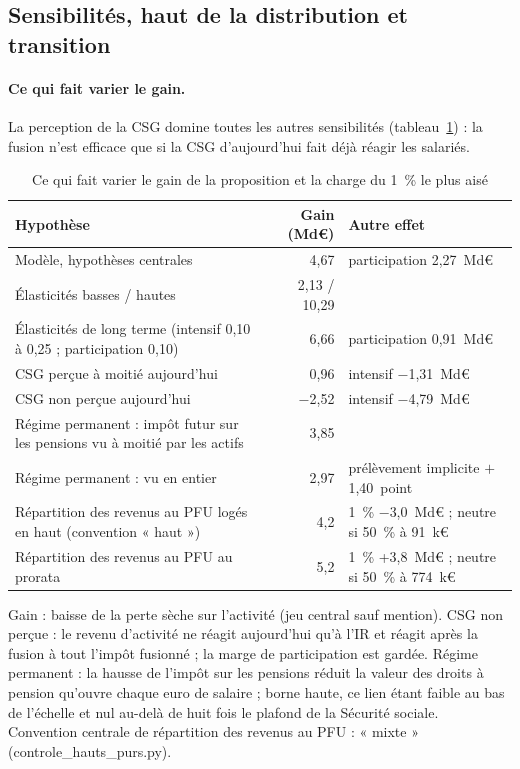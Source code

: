 \documentclass[11pt,a4paper]{article}
\begin{document}
\subsection{Sensibilités, haut de la distribution et transition}

\paragraph{Ce qui fait varier le gain.} La perception de la CSG domine toutes les autres sensibilités
(tableau~\ref{tab:ircsg_sens}) : la fusion n'est efficace que si la CSG d'aujourd'hui fait déjà réagir les salariés.

\begin{table}[!htbp]\centering\scriptsize\setlength{\tabcolsep}{4pt}
\caption{Ce qui fait varier le gain de la proposition et la charge du 1~\% le plus aisé}\label{tab:ircsg_sens}
{%
\begin{tabular}{@{}lrl@{}}
\toprule
Hypothèse & Gain (Md€) & Autre effet \\
\midrule
Modèle, hypothèses centrales & 4,67 & participation 2,27~Md€ \\
Élasticités basses / hautes & 2,13 / 10,29 & \\
Élasticités de long terme (intensif 0,10 à 0,25 ; participation 0,10) & 6,66 & participation 0,91~Md€ \\
CSG perçue à moitié aujourd'hui & 0,96 & intensif $-$1,31~Md€ \\
CSG non perçue aujourd'hui & $-$2,52 & intensif $-$4,79~Md€ \\
Régime permanent : impôt futur sur les pensions vu à moitié par les actifs & 3,85 & \\
Régime permanent : vu en entier & 2,97 & prélèvement implicite $+$1,40~point \\
Répartition des revenus au PFU logés en haut (convention « haut ») & 4,2 & 1~\% $-$3,0~Md€ ; neutre si 50~\% à 91~k€ \\
Répartition des revenus au PFU au prorata & 5,2 & 1~\% +3,8~Md€ ; neutre si 50~\% à 774~k€ \\
\bottomrule
\end{tabular}}
\par\vspace{3pt}\parbox{\linewidth}{\raggedright\scriptsize\color{encre}
Gain : baisse de la perte sèche sur l'activité (jeu central sauf mention). CSG non perçue : le revenu d'activité ne réagit aujourd'hui qu'à l'IR et réagit après la fusion à tout l'impôt fusionné ; la marge de participation est gardée. Régime permanent : la hausse de l'impôt sur les pensions réduit la valeur des droits à pension qu'ouvre chaque euro de salaire ; borne haute, ce lien étant faible au bas de l'échelle et nul au-delà de huit fois le plafond de la Sécurité sociale. Convention centrale de répartition des revenus au PFU : « mixte » (controle\_hauts\_purs.py).}
\end{table}
\end{document}
